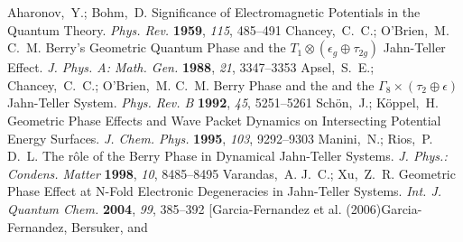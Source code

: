 \documentclass[superscriptaddress,showpacs,amsmath,amssymb,pra,twocolumn]{revtex4-1}
\begin{document}
\begin{thebibliography}{61}
{\mcitedefaultendpunct}{\mcitedefaultseppunct}\relax
\EndOfBibitem
{}
Aharonov,~Y.; Bohm,~D. Significance of {{Electromagnetic Potentials}} in the
  {{Quantum Theory}}. \emph{Phys. Rev.} \textbf{1959}, \emph{115},
  485--491\relax
\mciteBstWouldAddEndPuncttrue
\mciteSetBstMidEndSepPunct{\mcitedefaultmidpunct}
{\mcitedefaultendpunct}{\mcitedefaultseppunct}\relax
\EndOfBibitem
{}
Chancey,~C.~C.; O'Brien,~M. C.~M. Berry's Geometric Quantum Phase and the $T_1 \otimes (\epsilon_g \oplus \tau_{2g})$  Jahn-Teller Effect. \emph{J. Phys. A: Math. Gen.} \textbf{1988}, \emph{21}, 3347--3353\relax
\mciteBstWouldAddEndPuncttrue
\mciteSetBstMidEndSepPunct{\mcitedefaultmidpunct}
{\mcitedefaultendpunct}{\mcitedefaultseppunct}\relax
\EndOfBibitem
{}
Apsel,~S.~E.; Chancey,~C.~C.; O'Brien,~M. C.~M. Berry Phase and the and the
 $ \Gamma_8 \times (\tau_2 \oplus \epsilon) $
Jahn-Teller System. \emph{Phys. Rev. B} \textbf{1992},
  \emph{45}, 5251--5261\relax
\mciteBstWouldAddEndPuncttrue
\mciteSetBstMidEndSepPunct{\mcitedefaultmidpunct}
{\mcitedefaultendpunct}{\mcitedefaultseppunct}\relax
\EndOfBibitem
{}
Sch{\"o}n,~J.; K{\"o}ppel,~H. Geometric Phase Effects and Wave Packet Dynamics on
  Intersecting Potential Energy Surfaces. \emph{J. Chem. Phys.} \textbf{1995}, \emph{103}, 9292--9303\relax
\mciteBstWouldAddEndPuncttrue
\mciteSetBstMidEndSepPunct{\mcitedefaultmidpunct}
{\mcitedefaultendpunct}{\mcitedefaultseppunct}\relax
\EndOfBibitem
{}
Manini,~N.; Rios,~P. D.~L. The r\^{o}le of the {{Berry}} Phase in Dynamical
  {{Jahn}}-{{Teller}} Systems. \emph{J. Phys.: Condens. Matter}
  \textbf{1998}, \emph{10}, 8485--8495\relax
\mciteBstWouldAddEndPuncttrue
\mciteSetBstMidEndSepPunct{\mcitedefaultmidpunct}
{\mcitedefaultendpunct}{\mcitedefaultseppunct}\relax
\EndOfBibitem
{}
Varandas,~A. J.~C.; Xu,~Z.~R. Geometric Phase Effect at {{N}}-Fold Electronic
  Degeneracies in Jahn-Teller Systems. \emph{Int. J.  Quantum Chem.} \textbf{2004}, \emph{99}, 385--392\relax
\mciteBstWouldAddEndPuncttrue
\mciteSetBstMidEndSepPunct{\mcitedefaultmidpunct}
{\mcitedefaultendpunct}{\mcitedefaultseppunct}\relax
\EndOfBibitem
\bibitem[Garcia-Fernandez et al. (2006)Garcia-Fernandez, Bersuker, and

\end{thebibliography}
\end{document}

